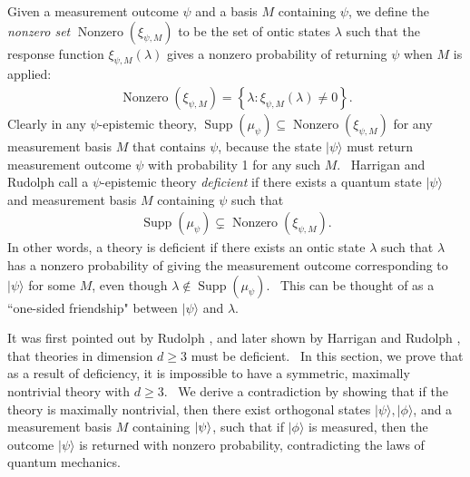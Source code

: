 \documentclass[letterpaper,12pt]{article}
\newcommand{\ket}[1]{\mbox{$ | #1 \rangle $}}
\DeclareMathOperator{\supp}{Supp}
\DeclareMathOperator{\nz}{Nonzero}
\begin{document}
Given a measurement outcome $\psi$ and a basis $M$ containing $\psi$, we define the \emph{nonzero set} $\nz(\xi_{\psi,M})$ to be the set of ontic states $\lambda$ such that the response function $\xi_{\psi,M}(\lambda)$ gives a nonzero probability of returning $\psi$ when $M$ is applied:
\begin{eqnarray}
\nz(\xi_{\psi,M}) = \left\{\lambda: \xi_{\psi,M}(\lambda)\neq0\right\}.
\end{eqnarray}
Clearly in any $\psi$-epistemic theory, $\supp(\mu_\psi)
\subseteq \nz(\xi_{\psi,M})$ for any measurement basis $M$ that contains $\psi$, because the state $ | \psi \rangle $ must return measurement
outcome $\psi$ with probability 1 for any such $M$. \ Harrigan and Rudolph \cite{hr} call a $\psi$-epistemic theory \textit{deficient} if there exists a quantum state $ | \psi
\rangle $ and measurement basis $M$ containing $\psi$ such that
\begin{eqnarray}
\supp(\mu_{\psi}) \subsetneq \nz(\xi_{\psi,M}).  \label{deficiency}
\end{eqnarray}
In other words, a theory is deficient if there exists an ontic state $\lambda$ such that $\lambda$
has a nonzero probability of giving the measurement outcome corresponding to $%
 | \psi \rangle $ for some $M$, even though $\lambda\notin \supp(\mu_{\psi})
$. \ This can be thought of as a ``one-sided friendship" between $%
 | \psi \rangle $ and $\lambda$.

It was first pointed out by Rudolph \cite{rudolph}, and later shown by
Harrigan and Rudolph \cite{hr}, that theories in dimension $d\geq 3$ must be
deficient. \ In this section, we prove that as a result of deficiency, it is impossible
to have a symmetric, maximally nontrivial theory with $d\geq 3$. \ We derive a
contradiction by showing that if the theory is maximally nontrivial, then
there exist orthogonal states $ | \psi \rangle, |
\phi \rangle $, and a measurement basis $M$ containing $\ket{\psi}$, such that if $ | \phi
\rangle $ is measured, then the outcome $ | \psi
\rangle $ is returned with nonzero probability, contradicting the
laws of quantum mechanics.
\end{document}
